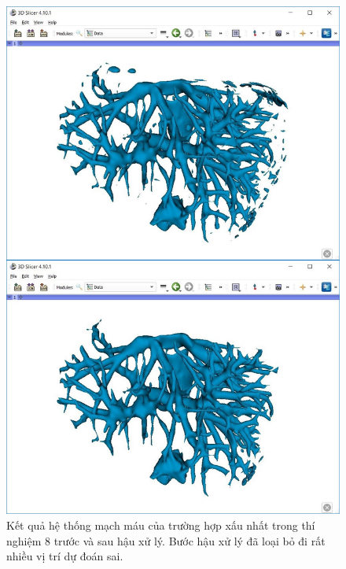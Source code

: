 	\begin{figure}[h!]
		\includegraphics[width=\textwidth, height=0.925\textheight]{figures/result_e8_worst_prediction_post_processing}
		\caption[Kết quả hệ thống mạch máu của trường hợp xấu nhất trong thí nghiệm 8.]{Kết quả hệ thống mạch máu của trường hợp xấu nhất trong thí nghiệm 8 trước và sau hậu xử lý. Bước hậu xử lý đã loại bỏ đi rất nhiều vị trí dự đoán sai.}
		\label{fig:result_e8_worst_prediction_post_processing}
	\end{figure}
